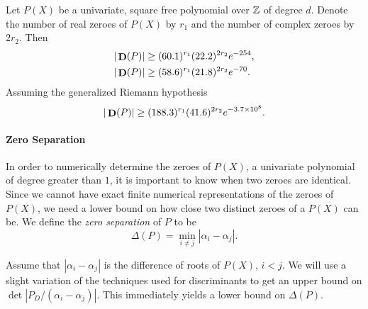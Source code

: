 \begin{proposition}
Let $P(X)$ be a univariate, square free polynomial over $\mathbb{Z}$ of degree
$d$.  Denote the number of real zeroes of $P(X)$ by $r_1$ and the
number of complex zeroes by $2r_2$.  Then
\[
\begin{aligned}
|\mathop{\mathbf{D}}\nolimits(P)| & \ge (60.1)^{r_1} (22.2)^{2r_2} e^{-254}, \\
|\mathop{\mathbf{D}}\nolimits(P)| & \ge (58.6)^{r_1} (21.8)^{2r_2} e^{-70}. \\
\end{aligned}
\]
Assuming the generalized Riemann hypothesis
\[
|\mathop{\mathbf{D}}\nolimits(P)| \ge (188.3)^{r_1} (41.6)^{2r_2} e^{-3.7\times10^8}.
\]
\end{proposition}


\paragraph{Zero Separation}

In order to numerically determine the zeroes of $P(X)$, a univariate
polynomial of degree greater than $1$, it is important to know when
two zeroes are identical.  Since we cannot have exact finite numerical
representations of the zeroes of $P(X)$, we need a lower bound on how
close two distinct zeroes of a $P(X)$ can be.  We define the {\em zero
  separation} of $P$ to be
\[
\Delta(P) = \min_{i \not= j} \left| \alpha_{i} - \alpha_{j} \right|.
\]

Assume that $|\alpha_i - \alpha_j|$ is the difference of roots of
$P(X)$, $i < j$.  We will use a slight variation of the techniques
used for discriminants to get an upper bound on $\det|P_D/(\alpha_i -
\alpha_j)|$.  This immediately yields a lower bound on $\Delta(P)$. 


